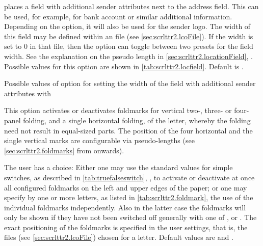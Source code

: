 \begin{Declaration}
\end{Declaration}
%
 places a field with additional sender attributes next
to the address field. This can be used, for example, for bank account
or similar additional information.  Depending on the
 option, it will also be used for the sender
logo. The width of this field may be defined within an  file
(see \autoref{sec:scrlttr2.lcoFile}). If the width is set to 0 in that file,
then the  option can toggle between two presets for
the field width. See the explanation on the  pseudo
length in \autoref{sec:scrlttr2.locationField},
. Possible values for this
option are shown in \autoref{tab:scrlttr2.locfield}. Default is
.

\begin{table}
  \caption[{Possible values of option  with
    }]{Possible values of option  for setting
    the width of the field with additional sender attributes with
    }
  \label{tab:scrlttr2.locfield}
  \begin{desctabular}
  \end{desctabular}
\end{table}
%
%

\begin{Declaration}
\end{Declaration}
%
This option activates or deactivates foldmarks for
vertical two-, three- or four-panel folding, and a single horizontal
folding, of the letter, whereby the folding need not result in
equal-sized parts. The position of the four horizontal and the single
vertical marks are configurable via pseudo-lengths (see
\autoref{sec:scrlttr2.foldmarks} from
 onwards).

The user has a choice: Either one may use the standard values for
simple switches, as described in
\autoref{tab:truefalseswitch},
, to activate or
deactivate at once all configured foldmarks on the left and upper
edges of the paper; or one may
specify by one or more letters, as listed in
\autoref{tab:scrlttr2.foldmark}, the use of the individual foldmarks
independently. Also in the latter case the foldmarks will only be
shown if they have not been switched off generally with one of
,  or . The exact positioning of
the foldmarks is specified in the user settings, that is, the
 files (see \autoref{sec:scrlttr2.lcoFile}) chosen for a
letter. Default values are  and .

